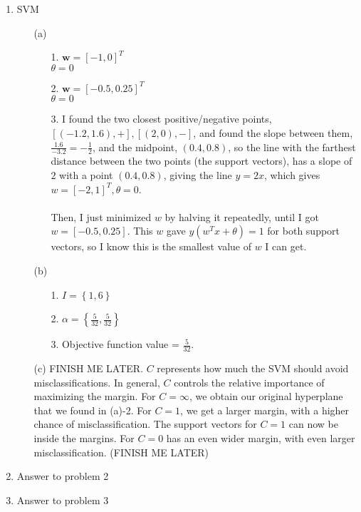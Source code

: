 

\oddsidemargin 0in
\evensidemargin 0in
\textwidth 6.5in
\topmargin -0.5in
\textheight 9.0in




\pagestyle{myheadings}  %

\begin{enumerate}
\item SVM
  \begin{enumerate}
  \item [(a)]
    \begin{enumerate}  
    \item [1.]
      $\textbf{w} = [-1,0]^T$\\
      $\theta = 0$
    \item [2.]
      $\textbf{w} = [-0.5,0.25]^T$\\
      $\theta = 0$
    \item [3.]
      I found the two closest positive/negative points, $[(-1.2,1.6), +], [(2,0), -]$, and found the slope between them, $\frac{1.6}{-3.2} = -\frac{1}{2}$, and the midpoint, $(0.4, 0.8)$, so the line with the farthest distance between the two points (the support vectors), has a slope of $2$ with a point $(0.4, 0.8)$, giving the line $y=2x$, which gives $w=[-2,1]^T, \theta=0$.\\\\
      Then, I just minimized $w$ by halving it repeatedly, until I got $w=[-0.5,0.25]$. This $w$ gave $y(w^Tx+\theta)=1$ for both support vectors, so I know this is the smallest value of $w$ I can get.      
    \end{enumerate}
  \item [(b)]
    \begin{enumerate}
    \item [1.]
      $I = \left\{1,6\right\}$
    \item [2.]
      $\alpha = \left\{\frac{5}{32},\frac{5}{32}\right\}$
    \item [3.]
      Objective function value = $\frac{5}{32}$.
    \end{enumerate}
  \item [(c)]
    FINISH ME LATER. $C$ represents how much the SVM should avoid misclassifications. In general, $C$ controls the relative importance of maximizing the margin. For $C=\infty$, we obtain our original hyperplane that we found in (a)-2. For $C=1$, we get a larger margin, with a higher chance of misclassification. The support vectors for $C=1$ can now be inside the margins. For $C=0$ has an even wider margin, with even larger misclassification. (FINISH ME LATER)
  \end{enumerate}
\item Answer to problem 2
\item Answer to problem 3
\end{enumerate}




